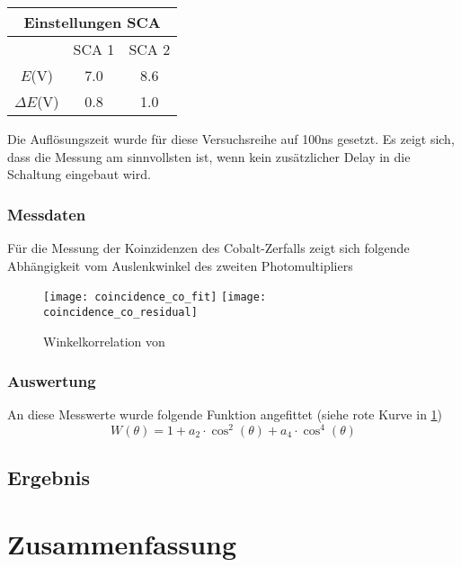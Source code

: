 \documentclass{../Misc/MontavonLaTeX/Montavon}
\newcommand{\halfwidth}{0.48\textwidth}
\begin{document}
\begin{tabular}{|c|c|c|}
\hline 
\multicolumn{3}{|c|}{Einstellungen SCA}\tabularnewline
\hline
\hline 
 & SCA 1 & SCA 2\tabularnewline
\hline 
$E$(V) & 7.0 & 8.6\tabularnewline
\hline 
$\Delta E$(V) & 0.8 & 1.0\tabularnewline
\hline
\end{tabular}

Die Auflösungszeit wurde für diese Versuchsreihe auf 100ns gesetzt. Es zeigt sich, dass die Messung am sinnvollsten ist, wenn kein zusätzlicher Delay in die Schaltung eingebaut wird. 

\subsubsection{Messdaten}
Für die Messung der Koinzidenzen des Cobalt-Zerfalls zeigt sich folgende Abhängigkeit vom Auslenkwinkel des zweiten Photomultipliers

\begin{figure}[h]
\texttt{[image: coincidence\_co\_fit]}
\texttt{[image: coincidence\_co\_residual]}
\caption{Winkelkorrelation von }
\label{fig:Co60}
\end{figure}

\subsubsection{Auswertung}

An diese Messwerte wurde folgende Funktion angefittet (siehe rote Kurve in \ref{fig:Co60})
\[
	W(\theta) = 1 + a_{2} \cdot \cos^2(\theta) + a_{4} \cdot \cos^4(\theta)
\]

\subsection{Ergebnis}

\section{Zusammenfassung}
\end{document}
